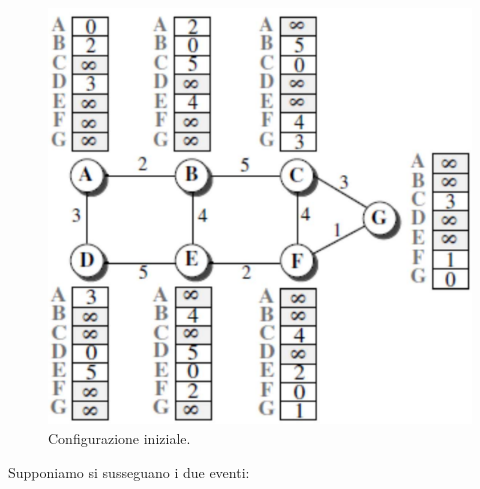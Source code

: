 \documentclass[11pt,a4paper,oneside]{book}
\theoremstyle{definition}
\begin{document}
\begin{figure}[!h]
	\includegraphics[scale=0.33]{Immagini/DV_es.png}
	\centering
	\caption{Configurazione iniziale.}
\end{figure}

Supponiamo si susseguano i due eventi:
\end{document}
